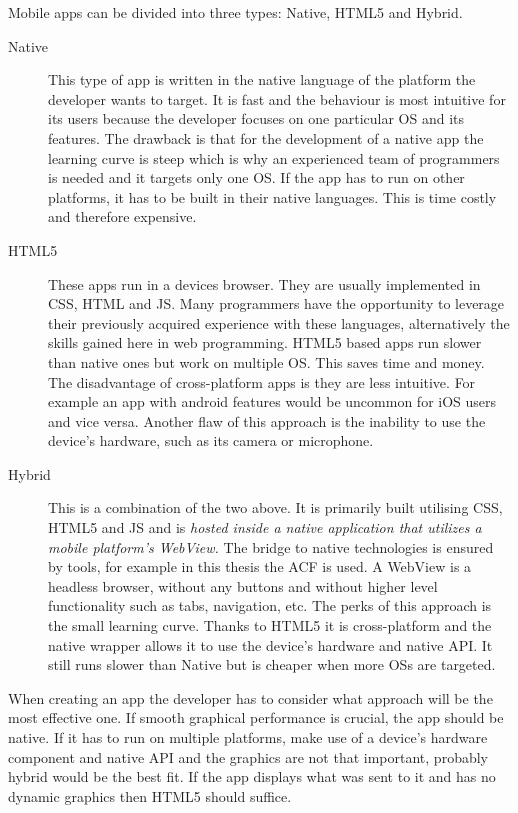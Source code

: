Mobile apps can be divided into three types: Native, HTML5 and Hybrid.
\begin {description}
\item [Native] This type of app is written in the native language of the platform the developer wants to target. It is fast and the behaviour is most intuitive for its users because the developer focuses on one particular OS and its features. The drawback is that for the development of a native app the learning curve is steep which is why an experienced team of programmers is needed and it targets only one OS. If the app has to run on other platforms, it has to be built in their native languages. This is time costly and therefore expensive. 
\item [HTML5] These apps run in a devices browser. They are usually implemented in CSS, HTML and JS. Many programmers have the opportunity to leverage their previously acquired experience with these languages, alternatively the skills gained here in web programming. HTML5 based apps run slower than native ones but work on multiple OS. This saves time and money. The disadvantage of cross-platform apps is they are less intuitive. For example an app with android features would be uncommon for iOS users and vice versa. Another flaw of this approach is the inability to use the device's hardware, such as its camera or microphone.
\item [Hybrid] This is a combination of the two above. It is primarily built utilising CSS, HTML5 and JS and is \textit{hosted inside a native application that utilizes a mobile platform’s WebView.} \cite{hybrid-mobile-app} The bridge to native technologies is ensured by tools, for example in this thesis the ACF is used. A WebView is a headless browser, without any buttons and without higher level functionality such as tabs, navigation, etc. The perks of this approach is the small learning curve. Thanks to HTML5 it is cross-platform and the native wrapper allows it to use the device's hardware and native API. It still runs slower than Native but is cheaper when more OSs are targeted.
\end{description}

When creating an app the developer has to consider what approach will be the most effective one. If smooth graphical performance is crucial, the app should be native. If it has to run on multiple platforms, make use of a device's hardware component and native API and the graphics are not that important, probably hybrid would be the best fit. If the app displays what was sent to it and has no dynamic graphics then HTML5 should suffice.

